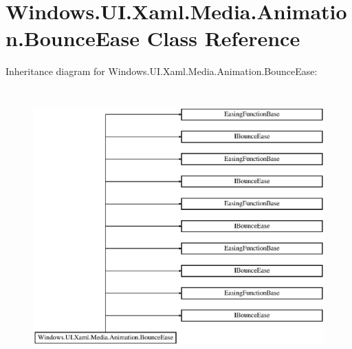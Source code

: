 \hypertarget{class_windows_1_1_u_i_1_1_xaml_1_1_media_1_1_animation_1_1_bounce_ease}{}\section{Windows.\+U\+I.\+Xaml.\+Media.\+Animation.\+Bounce\+Ease Class Reference}
\label{class_windows_1_1_u_i_1_1_xaml_1_1_media_1_1_animation_1_1_bounce_ease}
Inheritance diagram for Windows.\+U\+I.\+Xaml.\+Media.\+Animation.\+Bounce\+Ease\+:\begin{figure}[H]
\begin{center}
\leavevmode
\includegraphics[height=10.620689cm]{class_windows_1_1_u_i_1_1_xaml_1_1_media_1_1_animation_1_1_bounce_ease}
\end{center}
\end{figure}
